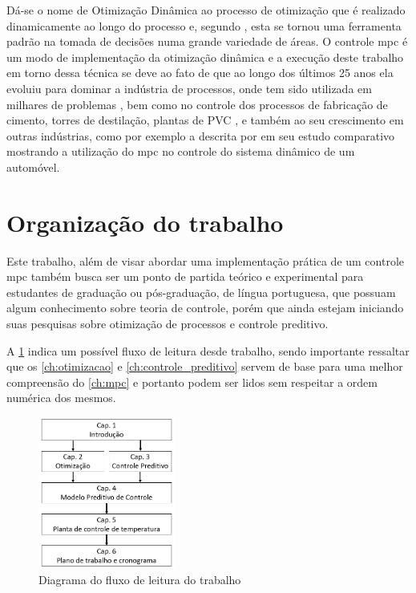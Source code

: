 Dá-se o nome de Otimização Dinâmica ao processo de otimização que é realizado
dinamicamente ao longo do processo e, segundo , esta se
tornou uma ferramenta padrão na tomada de decisões numa grande variedade de áreas.
O controle \acrshort{mpc} é um modo de implementação da otimização dinâmica e a execução
deste trabalho em torno dessa técnica se deve ao fato de que ao longo dos últimos 25 anos
ela evoluiu para dominar a indústria de processos, onde tem sido utilizada em milhares
de problemas \cite{Borrelli2017}, bem como no controle dos processos de fabricação de cimento,
torres de destilação, plantas de PVC \cite{Camacho2007}, e também ao seu crescimento em outras
indústrias, como por exemplo a descrita por  em seu estudo comparativo
mostrando a utilização do \acrshort{mpc} no controle do sistema dinâmico de um automóvel.

\section{Organização do trabalho}
\label{sec:organizacao_do_trabalho}

Este trabalho, além de visar abordar uma implementação prática de um controle \acrshort{mpc}
também busca ser um ponto de partida teórico e experimental para estudantes de graduação ou
pós-graduação, de língua portuguesa, que possuam algum conhecimento sobre teoria de controle,
porém que ainda estejam iniciando suas pesquisas sobre otimização de processos e controle preditivo.

A \cref{fig:estrutura_do_trabalho} indica um possível fluxo de leitura desde trabalho, sendo importante
ressaltar que os \cref{ch:otimizacao} e \cref{ch:controle_preditivo} servem de base para uma melhor
compreensão do \cref{ch:mpc} e portanto podem ser lidos sem respeitar a ordem numérica dos mesmos.

\begin{figure}[h]
	\begin{center}
		\includegraphics[width=0.4\textwidth]{./5_images/fig_estrutura_do_trabalho.png} 
		\caption{Diagrama do fluxo de leitura do trabalho}
		\label{fig:estrutura_do_trabalho}
	\end{center}
\end{figure}